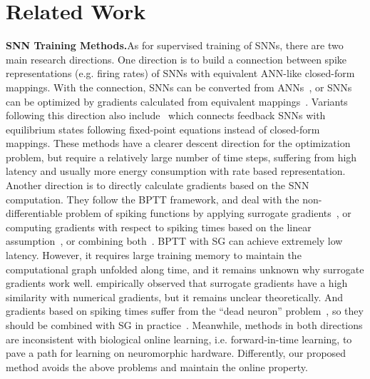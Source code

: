 \documentclass{article}
\begin{document}
\vspace{-2mm}
\section{Related Work}
\vspace{-2mm}

\textbf{SNN Training Methods.}\quad As for supervised training of SNNs, there are two main research directions. One direction is to build a connection between spike representations (e.g. firing rates) of SNNs with equivalent ANN-like closed-form mappings. With the connection, SNNs can be converted from ANNs~\cite{hunsberger2015spiking,rueckauer2017conversion,sengupta2019going,rathi2019enabling,han2020deep,deng2021optimal,yan2021near,li2021free,stockl2021optimized,meng2022trainingnn}, or SNNs can be optimized by gradients calculated from equivalent mappings~\cite{lee2016training,thiele2019spikegrad,wu2021training,zhou2021temporal,wu2021tandem,meng2022training}. Variants following this direction also include~\cite{xiao2021training} which connects feedback SNNs with equilibrium states following fixed-point equations instead of closed-form mappings. These methods have a clearer descent direction for the optimization problem, but require a relatively large number of time steps, suffering from high latency and usually more energy consumption with rate based representation. Another direction is to directly calculate gradients based on the SNN computation. They follow the BPTT framework, and deal with the non-differentiable problem of spiking functions by applying surrogate gradients~\cite{shrestha2018slayer,wu2018spatio,bellec2018long,jin2018hybrid,wu2019direct,neftci2019surrogate,zheng2020going,Fang_2021_ICCV,li2021differentiable,fang2021deep,deng2021temporal}, or computing gradients with respect to spiking times based on the linear assumption~\cite{bohte2002error,zhang2020temporal}, or combining both~\cite{kim2020unifying}. BPTT with SG can achieve extremely low latency. However, it requires large training memory to maintain the computational graph unfolded along time, and it remains unknown why surrogate gradients work well. \cite{li2021differentiable} empirically observed that surrogate gradients have a high similarity with numerical gradients, but it remains unclear theoretically. And gradients based on spiking times suffer from the ``dead neuron'' problem~\cite{shrestha2018slayer}, so they should be combined with SG in practice~\cite{zhang2020temporal,kim2020unifying}. 
Meanwhile, methods in both directions are inconsistent with biological online learning, i.e. forward-in-time learning, to pave a path for learning on neuromorphic hardware. Differently, our proposed method avoids the above problems and maintain the online property.
\end{document}
